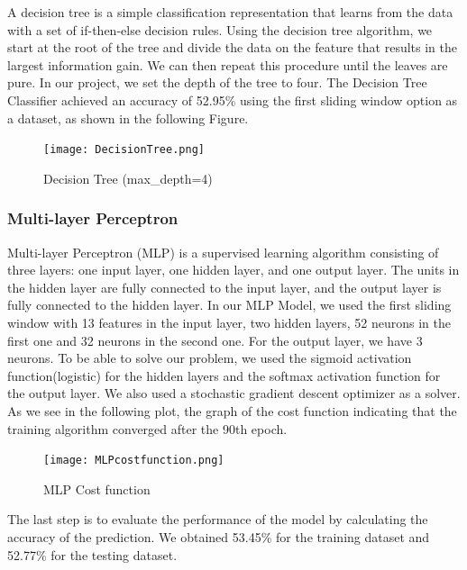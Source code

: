 A decision tree is a simple classification representation that learns from the data with a set of if-then-else decision rules.\newline \newline
Using the decision tree algorithm, we start at the root of the tree and divide the data on the feature that results in the largest information gain. We can then repeat this procedure until the leaves are pure.\newline \newline
In our project, we set the depth of the tree to four.\newline
The Decision Tree Classifier achieved an accuracy of 52.95\% using the first sliding window option as a dataset, as shown in the following Figure.
\begin{figure}[H]
\begin{center}
\texttt{[image: DecisionTree.png]}
\end{center}
\caption{Decision Tree (max\_depth=4)}
\label{fig:DecisionTree}
\end{figure}


\subsubsection{Multi-layer Perceptron}

Multi-layer Perceptron (MLP) is a supervised learning algorithm consisting of three layers: one input layer, one hidden layer, and one output layer. The units in the hidden layer are fully connected to the input layer, and the output layer is fully connected to the hidden layer.\newline \newline %
In our MLP Model, we used the first sliding window with 13 features in the input layer, two hidden layers, 52 neurons in the first one and 32 neurons in the second one. For the output layer, we have 3 neurons.\newline \newline  
To be able to solve our problem, we used the sigmoid activation function(logistic) for the hidden layers and the softmax activation function for the output layer. We also used a stochastic gradient descent optimizer as a solver. \newline 
As we see in the following plot, the graph of the cost function indicating that the training algorithm converged after the 90th epoch. \newline
\begin{figure}[H]
\begin{center}
\texttt{[image: MLPcostfunction.png]}
\end{center}
\caption{MLP Cost function}
\label{fig:MLPcostfunction}
\end{figure}
The last step is to evaluate the performance of the model by calculating the accuracy of the prediction. We obtained 53.45\% for the training dataset and 52.77\% for the testing dataset.


